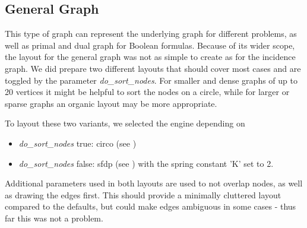 \documentclass[a4paper, 12pt, bibliography=totoc]{scrartcl}
\begin{document}


\subsection{General Graph}
This type of graph can represent the underlying graph for different problems, as well as primal and dual graph for Boolean formulas.
Because of its wider scope, the layout for the general graph was not as simple to create as for the incidence graph.
We did prepare two different layouts that should cover most cases and are toggled by the parameter \textit{do\_sort\_nodes}.
For smaller and dense graphs of up to 20 vertices it might be helpful to sort the nodes on a circle, while for larger or sparse graphs an organic layout may be more appropriate.

To layout these two variants, we selected the engine depending on
\begin{itemize}
	\item \textit{do\_sort\_nodes} true: circo (see \cite{ST99})
	\item \textit{do\_sort\_nodes} false: sfdp (see \cite{Hu05}) with the spring constant 'K' set to 2.
\end{itemize}

Additional parameters used in both layouts are used to not overlap nodes, as well as drawing the edges first. This should provide a minimally cluttered layout compared to the defaults, but could make edges ambiguous in some cases - thus far this was not a problem.
%
\end{document}
